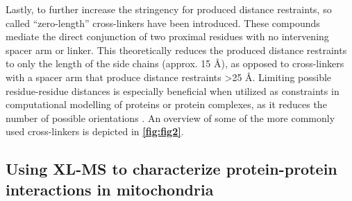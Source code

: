 Lastly, to further increase the stringency for produced distance restraints, so called “zero-length” cross-linkers have been introduced. These compounds mediate the direct conjunction of two proximal residues with no intervening spacer arm or linker. This theoretically reduces the produced distance restraints to only the length of the side chains (approx. 15 Å), as opposed to cross-linkers with a spacer arm that produce distance restraints >25 Å. Limiting possible residue-residue distances is especially beneficial when utilized as constraints in computational modelling of proteins or protein complexes, as it reduces the number of possible orientations \cite{Leitner_2014}. An overview of some of the more commonly used cross-linkers is depicted in \textbf{\autoref{fig:fig2}}.

\subsection{Using XL-MS to characterize protein-protein interactions in mitochondria}
